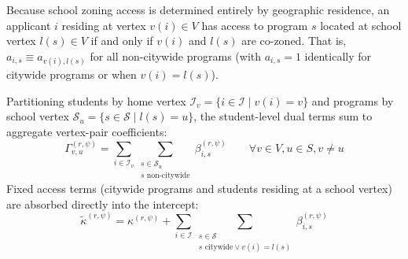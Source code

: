 \documentclass{article}
\begin{document}
Because school zoning access is determined entirely by geographic residence, an applicant $i$ residing at vertex $v(i) \in V$ has access to program $s$ located at school vertex $l(s) \in V$ if and only if $v(i)$ and $l(s)$ are co-zoned. That is, $a_{i,s} \equiv a_{v(i), l(s)}$ for all non-citywide programs (with $a_{i,s} = 1$ identically for citywide programs or when $v(i) = l(s)$). 

Partitioning students by home vertex $\mathcal{I}_v = \{i \in \mathcal{I} \mid v(i) = v\}$ and programs by school vertex $\mathcal{S}_u = \{s \in \mathcal{S} \mid l(s) = u\}$, the student-level dual terms sum to aggregate vertex-pair coefficients:
\begin{equation}
\Gamma_{v, u}^{(r, \psi)} = \sum_{i \in \mathcal{I}_v} \sum_{\substack{s \in \mathcal{S}_u \\ s \text{ non-citywide}}} \beta_{i,s}^{(r, \psi)} \qquad \forall v \in V, u \in S, v \neq u
\end{equation}
Fixed access terms (citywide programs and students residing at a school vertex) are absorbed directly into the intercept:
\begin{equation}
\tilde{\kappa}^{(r, \psi)} = \kappa^{(r, \psi)} + \sum_{i \in \mathcal{I}} \sum_{\substack{s \in \mathcal{S} \\ s \text{ citywide} \lor v(i) = l(s)}} \beta_{i,s}^{(r, \psi)}
\end{equation}
\end{document}
